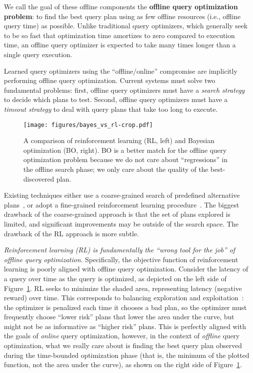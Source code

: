 We call the goal of these offline components the \textbf{offline query optimization problem}: to find the best query plan using as few offline resources (i.e., offline query time) as possible. Unlike traditional query optimizers, which generally seek to be so fast that optimization time amortizes to zero compared to execution time, an offline query optimizer is expected to take many times longer than a single query execution. 

Learned query optimizers using the ``offline/online'' compromise are implicitly performing offline query optimization. Current systems must solve two fundamental problems: first, offline query optimizers must have a \emph{search strategy} to decide which plans to test. Second, offline query optimizers must have a \emph{timeout strategy} to deal with query plans that take too long to execute. 


\begin{figure}
    \centering
    \texttt{[image: figures/bayes\_vs\_rl-crop.pdf]}
    \caption{A comparison of reinforcement learning (RL, left) and Bayesian optimization (BO, right). BO is a better match for the offline query optimization problem because we do not care about ``regressions'' in the offline search phase; we only care about the quality of the best-discovered plan.}
    \label{fig:bayes_vs_rl}
\end{figure}

 Existing techniques either use a coarse-grained search of predefined alternative plans~\cite{autosteer,bao_scope2}, or adopt a fine-grained reinforcement learning procedure~\cite{pilotscope,eraser_lqo}. The biggest drawback of the coarse-grained approach is that the set of plans explored is limited, and significant improvements may be outside of the search space. The drawback of the RL approach is more subtle.

\emph{Reinforcement learning (RL) is fundamentally the ``wrong tool for the job'' of offline query optimization.} Specifically, the objective function of reinforcement learning is poorly aligned with offline query optimization. Consider the latency of a query over time as the query is optimized, as depicted on the left side of Figure~\ref{fig:bayes_vs_rl}. RL seeks to minimize the shaded area, representing latency (negative reward) over time. This corresponds to balancing exploration and exploitation~\cite{rl_book}: the optimizer is penalized each time it chooses a bad plan, so the optimizer must frequently choose ``lower risk'' plans that lower the area under the curve, but might not be as informative as ``higher risk'' plans. This is perfectly aligned with the goals of \emph{online} query optimization, however, in the context of \emph{offline} query optimization, what we really care about is finding the best query plan observed during the time-bounded optimization phase (that is, the minimum of the plotted function, not the area under the curve), as shown on the right side of Figure~\ref{fig:bayes_vs_rl}.

